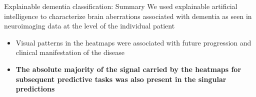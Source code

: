 \begin{frame}{Explainable dementia classification: Summary}
    We used explainable artificial intelligence to characterize brain aberrations associated with dementia as seen in neuroimaging data at the level of the individual patient
    \begin{itemize}
        \item Visual patterns in the heatmaps were associated with future progression and clinical manifestation of the disease
        \item \textbf{The absolute majority of the signal carried by the heatmaps for subsequent predictive tasks was also present in the singular predictions}
    \end{itemize}
\end{frame}
